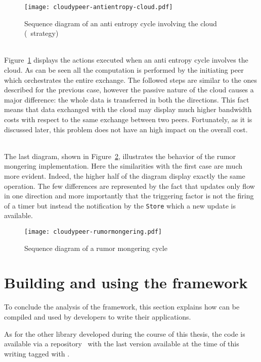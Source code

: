 \begin{figure}[h]
  \centering
  \texttt{[image: cloudypeer-antientropy-cloud.pdf]}
  \caption{Sequence diagram of an anti entropy cycle involving the
    cloud (\PUSHPULL\ strategy)}
  \label{fig:cloudypeer-sequence-antientropy-cloud}
\end{figure}

\ \\
\noindent Figure~\ref{fig:cloudypeer-sequence-antientropy-cloud} displays the
actions executed when an anti entropy cycle involves the cloud. As
can be seen all the computation is performed by the initiating peer
which orchestrates the entire exchange. The followed steps are similar
to the ones described for the previous case, however the passive
nature of the cloud causes a major difference: the whole data is
transferred in both the directions. This fact means that data exchanged
with the cloud may display much higher bandwidth costs with respect
to the same exchange between two peers. Fortunately, as it is
discussed later, this problem does not have an high impact on the
overall cost.

\ \\
\noindent The last diagram, shown in
Figure~\ref{fig:cloudypeer-sequence-rumormongering}, illustrates the
behavior of the rumor mongering implementation. Here the similarities
with the first case are much more evident. Indeed, the higher half of the
diagram display exactly the same operation. The few differences are
represented by the fact that updates only flow in one direction and
more importantly that the triggering factor is not the firing of a
timer but instead the notification by the \texttt{Store} which a new
update is available.

\begin{figure}[H]
  \centering
  \texttt{[image: cloudypeer-rumormongering.pdf]}
  \caption{Sequence diagram of a rumor mongering cycle}
  \label{fig:cloudypeer-sequence-rumormongering}
\end{figure}

\clearpage
\section{Building and using the framework}
To conclude the analysis of the framework, this section explains
how \cloudypeer can be compiled and used by developers to
write their \ptop applications.

As for the other library developed during the course of this thesis,
the code is available via a \github repository~\cite{cloudypeer-repo}
with the last version available at the time of this writing tagged
with \thesistag.

